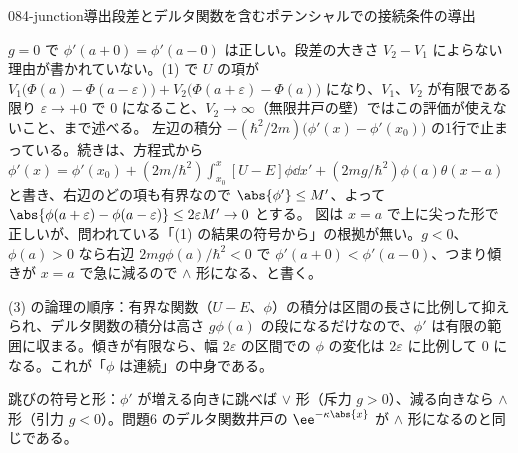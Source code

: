 \documentclass[uplatex,dvipdfmx,a4paper,11pt]{jsarticle}
\begin{document}
\begin{mondai}{084-junction}{導出}{段差とデルタ関数を含むポテンシャルでの接続条件の導出}
\begin{kotaeran}
   $g=0$ で $\phi'(a+0)=\phi'(a-0)$ は正しい。段差の大きさ $V_{2}-V_{1}$ によらない理由が書かれていない。(1) で $U$ の項が $V_{1}\bigl(\Phi(a)-\Phi(a-\varepsilon)\bigr)+V_{2}\bigl(\Phi(a+\varepsilon)-\Phi(a)\bigr)$ になり、$V_{1}$、$V_{2}$ が有限である限り $\varepsilon\to+0$ で $0$ になること、$V_{2}\to\infty$（無限井戸の壁）ではこの評価が使えないこと、まで述べる。
   左辺の積分 $-(\hbar^{2}/2m)\bigl(\phi'(x)-\phi'(x_{0})\bigr)$ の1行で止まっている。続きは、方程式から $\phi'(x)=\phi'(x_{0})+(2m/\hbar^{2})\int_{x_{0}}^{x}[U-E]\phi\dd x'+(2mg/\hbar^{2})\phi(a)\theta(x-a)$ と書き、右辺のどの項も有界なので $\abs{\phi'}\le M'$、よって $\abs{\phi(a+\varepsilon)-\phi(a-\varepsilon)}\le 2\varepsilon M'\to0$ とする。
   図は $x=a$ で上に尖った形で正しいが、問われている「(1) の結果の符号から」の根拠が無い。$g<0$、$\phi(a)>0$ なら右辺 $2mg\phi(a)/\hbar^{2}<0$ で $\phi'(a+0)<\phi'(a-0)$、つまり傾きが $x=a$ で急に減るので $\wedge$ 形になる、と書く。
\end{kotaeran}
\begin{rikai}
  \item (3) の論理の順序：有界な関数（$U-E$、$\phi$）の積分は区間の長さに比例して抑えられ、デルタ関数の積分は高さ $g\phi(a)$ の段になるだけなので、$\phi'$ は有限の範囲に収まる。傾きが有限なら、幅 $2\varepsilon$ の区間での $\phi$ の変化は $2\varepsilon$ に比例して $0$ になる。これが「$\phi$ は連続」の中身である。
  \item 跳びの符号と形：$\phi'$ が増える向きに跳べば $\vee$ 形（斥力 $g>0$）、減る向きなら $\wedge$ 形（引力 $g<0$）。問題6 のデルタ関数井戸の $\ee^{-\kappa\abs{x}}$ が $\wedge$ 形になるのと同じである。
\end{rikai}
\end{mondai}
\end{document}
